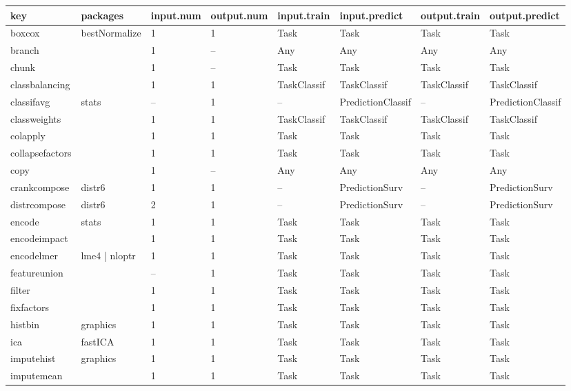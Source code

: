 \documentclass[]{scrbook}
\begin{document}
\begin{table}[H]
\centering\begingroup\fontsize{12}{14}\selectfont

\begin{tabular}{l|l|l|l|l|l|l|l}
\hline
key & packages & input.num & output.num & input.train & input.predict & output.train & output.predict\\
\hline
boxcox & bestNormalize & 1 & 1 & Task & Task & Task & Task\\
\hline
branch &  & 1 & -- & Any & Any & Any & Any\\
\hline
chunk &  & 1 & -- & Task & Task & Task & Task\\
\hline
classbalancing &  & 1 & 1 & TaskClassif & TaskClassif & TaskClassif & TaskClassif\\
\hline
classifavg & stats & -- & 1 & -- & PredictionClassif & -- & PredictionClassif\\
\hline
classweights &  & 1 & 1 & TaskClassif & TaskClassif & TaskClassif & TaskClassif\\
\hline
colapply &  & 1 & 1 & Task & Task & Task & Task\\
\hline
collapsefactors &  & 1 & 1 & Task & Task & Task & Task\\
\hline
copy &  & 1 & -- & Any & Any & Any & Any\\
\hline
crankcompose & distr6 & 1 & 1 & -- & PredictionSurv & -- & PredictionSurv\\
\hline
distrcompose & distr6 & 2 & 1 & -- & PredictionSurv & -- & PredictionSurv\\
\hline
encode & stats & 1 & 1 & Task & Task & Task & Task\\
\hline
encodeimpact &  & 1 & 1 & Task & Task & Task & Task\\
\hline
encodelmer & lme4 | nloptr & 1 & 1 & Task & Task & Task & Task\\
\hline
featureunion &  & -- & 1 & Task & Task & Task & Task\\
\hline
filter &  & 1 & 1 & Task & Task & Task & Task\\
\hline
fixfactors &  & 1 & 1 & Task & Task & Task & Task\\
\hline
histbin & graphics & 1 & 1 & Task & Task & Task & Task\\
\hline
ica & fastICA & 1 & 1 & Task & Task & Task & Task\\
\hline
imputehist & graphics & 1 & 1 & Task & Task & Task & Task\\
\hline
imputemean &  & 1 & 1 & Task & Task & Task & Task\\

\end{tabular}
\end{table}
\end{document}
